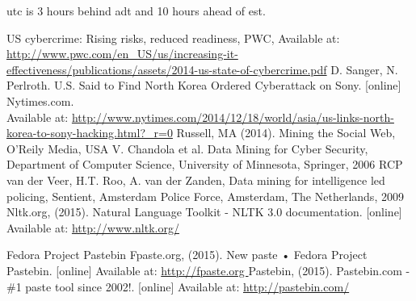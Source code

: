\documentclass[12pt]{article}
\begin{document}
 
\gls{utc} is 3 hours behind \gls{adt} and 10 hours ahead of \gls{est}.
 
\printglossaries
\newpage

\begin{thebibliography}{99}
US cybercrime: Rising risks, reduced readiness, PWC, Available at: \url{http://www.pwc.com/en_US/us/increasing-it-effectiveness/publications/assets/2014-us-state-of-cybercrime.pdf}
	 D. Sanger, N. Perlroth.  U.S. Said to Find North Korea Ordered Cyberattack on Sony. [online] Nytimes.com. \\Available at: \url{http://www.nytimes.com/2014/12/18/world/asia/us-links-north-korea-to-sony-hacking.html?_r=0}
  Russell, MA (2014). Mining the Social Web, O'Reily Media, USA
    V. Chandola et al. Data Mining for Cyber Security, Department of Computer Science, University of Minnesota, Springer, 2006
   RCP van der Veer, H.T. Roo,  A. van der Zanden, Data mining for intelligence led policing, Sentient, Amsterdam Police Force, Amsterdam, The Netherlands, 2009
Nltk.org, (2015). Natural Language Toolkit - NLTK 3.0 documentation. [online] Available at: \url{http://www.nltk.org/}

Fedora Project Pastebin Fpaste.org, (2015). New paste • Fedora Project Pastebin. [online] Available at:  
\url{http://fpaste.org }
Pastebin, (2015). Pastebin.com - \#1 paste tool since 2002!. [online] Available at:     \url{http://pastebin.com/}


\end{thebibliography}
\end{document}
